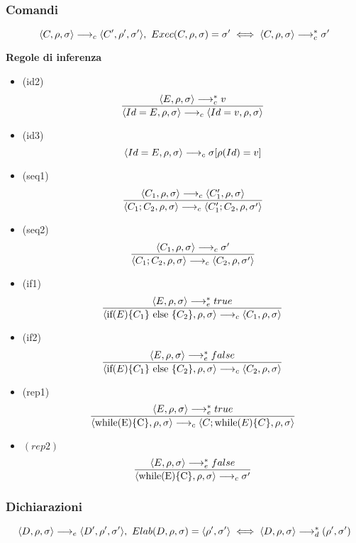 \documentclass{article}
\begin{document}
\subsubsection{Comandi}
\[\langle C,\rho,\sigma \rangle \longrightarrow_c \langle C',\rho',\sigma' \rangle,\ Exec(C,\rho,\sigma) = \sigma' \iff \langle C,\rho,\sigma \rangle \longrightarrow_c^* \sigma'\]

\noindent\textbf{Regole di inferenza}
\begin{itemize}
    \item (id2)
          \[\frac
              {\langle E,\rho,\sigma \rangle \longrightarrow_c^* v}
              {\langle Id = E,\rho,\sigma \rangle \longrightarrow_c \langle Id = v,\rho,\sigma \rangle}\]
    \item (id3)
          \[\langle Id = E,\rho,\sigma \rangle \longrightarrow_c \sigma[\rho(Id) = v]\]

    \item (seq1)
          \[\frac
              {\langle C_1,\rho,\sigma \rangle \longrightarrow_c \langle C_1',\rho,\sigma \rangle}
              {\langle C_1;C_2,\rho,\sigma \rangle \longrightarrow_c \langle C_1';C_2,\rho,\sigma' \rangle}\]
    \item (seq2)
          \[\frac
              {\langle C_1,\rho,\sigma \rangle \longrightarrow_c \sigma'}
              {\langle C_1;C_2,\rho,\sigma \rangle \longrightarrow_c \langle C_2,\rho,\sigma' \rangle}\]

    \item (if1)
          \[\frac
              {\langle E,\rho,\sigma \rangle \longrightarrow_e^* true}
              {\langle \text{if($E$)\{$C_1$\} else \{$C_2$\}},\rho,\sigma \rangle \longrightarrow_c \langle C_1,\rho,\sigma \rangle}\]
    \item (if2)
          \[\frac
              {\langle E,\rho,\sigma \rangle \longrightarrow_e^* false}
              {\langle \text{if($E$)\{$C_1$\} else \{$C_2$\}},\rho,\sigma \rangle \longrightarrow_c \langle C_2,\rho,\sigma \rangle}\]

    \item (rep1)
          \[\frac
              {\langle E,\rho,\sigma \rangle \longrightarrow_e^* true}
              {\langle \text{while(E)\{C\}},\rho,\sigma \rangle \longrightarrow_c \langle C;\text{while($E$)\{$C$\}},\rho,\sigma \rangle}\]
    \item \((rep2)\)
          \[\frac
              {\langle E,\rho,\sigma \rangle \longrightarrow_e^* false}
              {\langle \text{while(E)\{C\}},\rho,\sigma \rangle \longrightarrow_c \sigma'}\]
\end{itemize}

\subsubsection{Dichiarazioni}
\[\langle D,\rho,\sigma \rangle \longrightarrow_e \langle D',\rho',\sigma' \rangle,\ Elab(D,\rho,\sigma) = \langle \rho',\sigma' \rangle \iff \langle D,\rho,\sigma \rangle \longrightarrow_d^* (\rho',\sigma')\]
\end{document}
